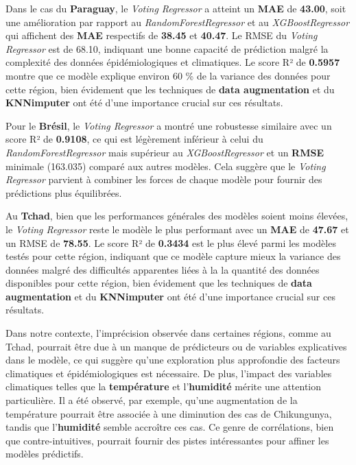 Dans le cas du \textbf{Paraguay}, le \textit{Voting Regressor} a atteint un \textbf{MAE} de \textbf{43.00}, soit une amélioration par rapport au \textit{RandomForestRegressor} et au \textit{XGBoostRegressor} qui affichent des \textbf{MAE} respectifs de \textbf{38.45} et \textbf{40.47}. Le RMSE du \textit{Voting Regressor} est de 68.10, indiquant une bonne capacité de prédiction malgré la complexité des données épidémiologiques et climatiques. Le score R² de \textbf{0.5957 } montre que ce modèle explique environ 60 \% de la variance des données pour cette région, bien évidement que les techniques de \textbf{data augmentation} et du \textbf{KNNimputer} ont été d'une importance crucial sur ces résultats.

Pour le \textbf{Brésil}, le \textit{Voting Regressor} a montré une robustesse similaire avec un score R² de \textbf{0.9108}, ce qui est légèrement inférieur à celui du \textit{RandomForestRegressor} mais supérieur au \textit{XGBoostRegressor} et un \textbf{RMSE} minimale (163.035) comparé aux autres modèles. Cela suggère que le \textit{Voting Regressor} parvient à combiner les forces de chaque modèle pour fournir des prédictions plus équilibrées.

Au \textbf{Tchad}, bien que les performances générales des modèles soient moins élevées, le \textit{Voting Regressor} reste le modèle le plus performant avec un \textbf{MAE} de \textbf{47.67} et un RMSE de \textbf{78.55}. Le score R² de \textbf{0.3434} est le plus élevé parmi les modèles testés pour cette région, indiquant que ce modèle capture mieux la variance des données malgré des difficultés apparentes liées à la la quantité des données disponibles pour cette région, bien évidement que les techniques de \textbf{data augmentation} et du \textbf{KNNimputer} ont été d'une importance crucial sur ces résultats.

Dans notre contexte, l'imprécision observée dans certaines régions, comme au Tchad, pourrait être due à un manque de prédicteurs ou de variables explicatives dans le modèle, ce qui suggère qu'une exploration plus approfondie des facteurs climatiques et épidémiologiques est nécessaire. De plus, l'impact des variables climatiques telles que la \textbf{température} et l'\textbf{humidité} mérite une attention particulière. Il a été observé, par exemple, qu'une augmentation de la température pourrait être associée à une diminution des cas de Chikungunya, tandis que l'\textbf{humidité} semble accroître ces cas. Ce genre de corrélations, bien que contre-intuitives, pourrait fournir des pistes intéressantes pour affiner les modèles prédictifs.